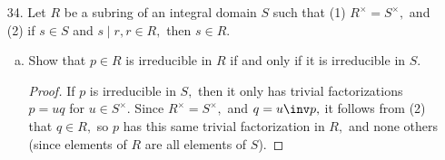 \documentclass{article}
\begin{document}
\begin{itemize}
\begin{enumerate}[(a)]
			\item If $0\neq a\in R,$ then $c(af)\sim ac(f).$
				\begin{proof}
					Let
					\begin{align*}
						f &= a_0 + a_1x + \cdots + a_n x^n \\
						a &= up_1^{a_1} \cdots p_r^{a_r} \\
						a_0 &= u_0 p_1^{a_{01}} \cdots p_r^{a_{0r}} \\
						\vdots &\\
						a_n &= u_n p_1^{a_{n1}} \cdots p_r^{a_{nr}}
					\end{align*}
					where $p_j$ are all the primes that appear in the factorizations of $a$ and the coefficients, and the exponents are all nonnegative. Then
					\[af=aa_0+aa_1x+\cdots + aa_n x^n\]
					where
					\[aa_i = uu_i p_1^{a_1+a_{i1}}\cdots p_r^{a_r+a_{ir}}\]
					Now, let
					\begin{align*}
						d_i &:= \min\left\{ a_{0i}, a_{1i}, \cdots, a_{ni} \right\} \\
						e_i&:=\min\left\{ a_i+a_{0i}, a_i+a_{1i}, \cdots, a_i + a_{ni} \right\} = a_i + d_i
					\end{align*}
					for all $1\le i\le r.$ Then we have
					\begin{align*}
						c(af) &\sim p_1^{e_1}\cdots p_r^{e_r} \\
						&= p_1^{a_1+d_1} \cdots p_r^{a_r+d_r} \\
						&= \left( p_1^{a_1}\cdots p_r^{a_r} \right)( p_1^{d_1} \cdots p_r^{d_r}) \\
						&\sim a c(f)
					\end{align*}
					as desired.
				\end{proof}

		\end{enumerate}

	\item[34.] Let $R$ be a subring of an integral domain $S$ such that (1) $R^\times=S^\times,$ and (2) if $s\in S$ and $s\mid r, r\in R,$ then $s\in R.$ 

		\begin{enumerate}[(a)]
			\item Show that $p\in R$ is irreducible in $R$ if and only if it is irreducible in $S.$
				\begin{proof}
					If $p$ is irreducible in $S,$ then it only has trivial factorizations $p=uq$ for $u\in S^\times.$ Since $R^\times = S^\times,$ and $q=u\inv p,$ it follows from (2) that $q\in R,$ so $p$ has this same trivial factorization in $R,$ and none others (since elements of $R$ are all elements of $S$).


\end{proof}
\end{enumerate}
\end{itemize}
\end{document}

